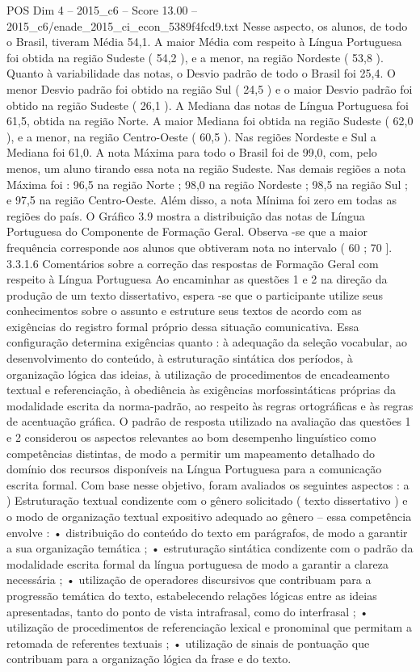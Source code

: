 \begin{textsample}{POS Dim 4 – 2015\_c6 – Score 13.00 – 2015\_c6/enade\_2015\_ci\_econ\_5389f4fcd9.txt}
Nesse aspecto, os alunos, de todo o Brasil, tiveram Média 54,1.
A maior Média com respeito à Língua Portuguesa foi obtida na região Sudeste ( 54,2 ), e a menor, na região Nordeste ( 53,8 ).
Quanto à variabilidade das notas, o Desvio padrão de todo o Brasil foi 25,4.
O menor Desvio padrão foi obtido na região Sul ( 24,5 ) e o maior Desvio padrão foi obtido na região Sudeste ( 26,1 ).
A Mediana das notas de Língua Portuguesa foi 61,5, obtida na região Norte.
A maior Mediana foi obtida na região Sudeste ( 62,0 ), e a menor, na região Centro-Oeste ( 60,5 ).
Nas regiões Nordeste e Sul a Mediana foi 61,0.
A nota Máxima para todo o Brasil foi de 99,0, com, pelo menos, um aluno tirando essa nota na região Sudeste.
Nas demais regiões a nota Máxima foi : 96,5 na região Norte ; 98,0 na região Nordeste ; 98,5 na região Sul ; e 97,5 na região Centro-Oeste.
Além disso, a nota Mínima foi zero em todas as regiões do país.
O Gráfico 3.9 mostra a distribuição das notas de Língua Portuguesa do Componente de Formação Geral.
Observa -se que a maior frequência corresponde aos alunos que obtiveram nota no intervalo ( 60 ; 70 ]. 3.3.1.6 Comentários sobre a correção das respostas de Formação Geral com respeito à Língua Portuguesa Ao encaminhar as questões 1 e 2 na direção da produção de um texto dissertativo, espera -se que o participante utilize seus conhecimentos sobre o assunto e estruture seus textos de acordo com as exigências do registro formal próprio dessa situação comunicativa.
Essa configuração determina exigências quanto : à adequação da seleção vocabular, ao desenvolvimento do conteúdo, à estruturação sintática dos períodos, à organização lógica das ideias, à utilização de procedimentos de encadeamento textual e referenciação, à obediência às exigências morfossintáticas próprias da modalidade escrita da norma-padrão, ao respeito às regras ortográficas e às regras de acentuação gráfica.
O padrão de resposta utilizado na avaliação das questões 1 e 2 considerou os aspectos relevantes ao bom desempenho linguístico como competências distintas, de modo a permitir um mapeamento detalhado do domínio dos recursos disponíveis na Língua Portuguesa para a comunicação escrita formal.
Com base nesse objetivo, foram avaliados os seguintes aspectos : a ) Estruturação textual condizente com o gênero solicitado ( texto dissertativo ) e o modo de organização textual expositivo adequado ao gênero – essa competência envolve : • distribuição do conteúdo do texto em parágrafos, de modo a garantir a sua organização temática ; • estruturação sintática condizente com o padrão da modalidade escrita formal da língua portuguesa de modo a garantir a clareza necessária ; • utilização de operadores discursivos que contribuam para a progressão temática do texto, estabelecendo relações lógicas entre as ideias apresentadas, tanto do ponto de vista intrafrasal, como do interfrasal ; • utilização de procedimentos de referenciação lexical e pronominal que permitam a retomada de referentes textuais ; • utilização de sinais de pontuação que contribuam para a organização lógica da frase e do texto.

\end{textsample}
